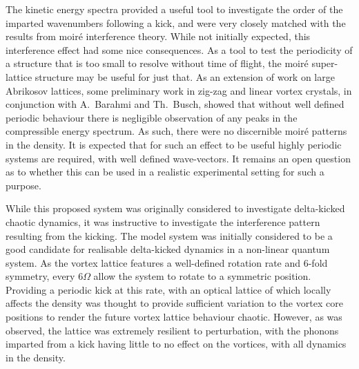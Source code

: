 The kinetic energy spectra provided a useful tool to investigate the order of the imparted wavenumbers following a kick, and were very closely matched with the results from moir\'e interference theory. While not initially expected, this interference effect had some nice consequences. As a tool to test the periodicity of a structure that is too small to resolve without time of flight, the moir\'e super-lattice structure may be useful for just that. As an extension of work on large Abrikosov lattices, some preliminary work in zig-zag and linear vortex crystals, in conjunction with A.~Barahmi and Th.~Busch, showed that without well defined periodic behaviour there is negligible observation of any peaks in the compressible energy spectrum. As such, there were no discernible moir\'e patterns in the density. It is expected that for such an effect to be useful highly periodic systems are required, with well defined wave-vectors. It remains an open question as to whether this can be used in a realistic experimental setting for such a purpose.

While this proposed system was originally considered to investigate delta-kicked chaotic dynamics, it was instructive to investigate the interference pattern resulting from the kicking. The model system was initially considered to be a good candidate for realisable delta-kicked dynamics in a non-linear quantum system. As the vortex lattice features a well-defined rotation rate and 6-fold symmetry, every $6\Omega$ allow the system to rotate to a symmetric position. Providing a periodic kick at this rate, with an optical lattice of which locally affects the density was thought to provide sufficient variation to the vortex core positions to render the future vortex lattice behaviour chaotic. However, as was observed, the lattice was extremely resilient to perturbation, with the phonons imparted from a kick having little to no effect on the vortices, with all dynamics in the density.
